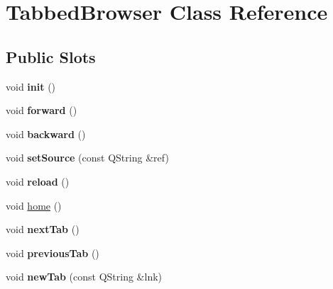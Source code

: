 \hypertarget{classTabbedBrowser}{
\section{TabbedBrowser Class Reference}
\label{classTabbedBrowser}
}
\subsection*{Public Slots}
\begin{DoxyCompactItemize}
\item 
\hypertarget{classTabbedBrowser_a7bb1d33f3069c51d5441f3fad5d27372}{
void {\bfseries init} ()}
\label{classTabbedBrowser_a7bb1d33f3069c51d5441f3fad5d27372}

\item 
\hypertarget{classTabbedBrowser_a9d17f282100f9444324056835aa36322}{
void {\bfseries forward} ()}
\label{classTabbedBrowser_a9d17f282100f9444324056835aa36322}

\item 
\hypertarget{classTabbedBrowser_a5319a0a27183c87ad45478ceb5c20a3b}{
void {\bfseries backward} ()}
\label{classTabbedBrowser_a5319a0a27183c87ad45478ceb5c20a3b}

\item 
\hypertarget{classTabbedBrowser_aa86e16c8670dd046ac165be4447a107e}{
void {\bfseries setSource} (const QString \&ref)}
\label{classTabbedBrowser_aa86e16c8670dd046ac165be4447a107e}

\item 
\hypertarget{classTabbedBrowser_ad7e895ccb5a2cdcf778e332e913a85ed}{
void {\bfseries reload} ()}
\label{classTabbedBrowser_ad7e895ccb5a2cdcf778e332e913a85ed}

\item 
void \hyperlink{classTabbedBrowser_a4f30e95f934c928f3bbddb02965799cd}{home} ()
\item 
\hypertarget{classTabbedBrowser_adf271e998e80c0cadf249e420421df4a}{
void {\bfseries nextTab} ()}
\label{classTabbedBrowser_adf271e998e80c0cadf249e420421df4a}

\item 
\hypertarget{classTabbedBrowser_a76cfacbcc1fed395a52973cd7d15b88f}{
void {\bfseries previousTab} ()}
\label{classTabbedBrowser_a76cfacbcc1fed395a52973cd7d15b88f}

\item 
\hypertarget{classTabbedBrowser_a8a49676308e2b214d64a2c5bfe6ea959}{
void {\bfseries newTab} (const QString \&lnk)}
\label{classTabbedBrowser_a8a49676308e2b214d64a2c5bfe6ea959}


\end{DoxyCompactItemize}
